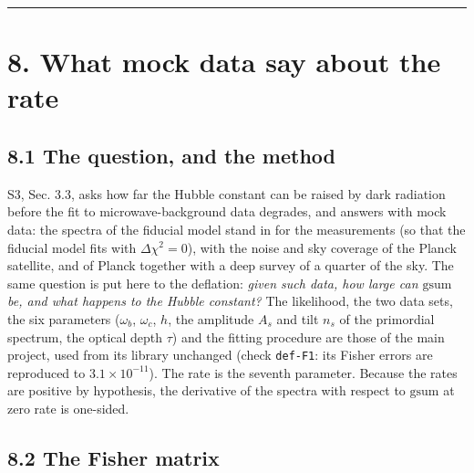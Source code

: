 \documentclass[
  10pt,
]{article}
\begin{document}
\begin{center}\rule{0.5\linewidth}{0.5pt}\end{center}

\hypertarget{what-mock-data-say-about-the-rate}{%
\section{8. What mock data say about the
rate}\label{what-mock-data-say-about-the-rate}}

\hypertarget{the-question-and-the-method}{%
\subsection{8.1 The question, and the
method}\label{the-question-and-the-method}}

S3, Sec. 3.3, asks how far the Hubble constant can be raised by dark
radiation before the fit to microwave-background data degrades, and
answers with mock data: the spectra of the fiducial model stand in for
the measurements (so that the fiducial model fits with
\(\Delta\chi^2=0\)), with the noise and sky coverage of the Planck
satellite, and of Planck together with a deep survey of a quarter of the
sky. The same question is put here to the deflation: \emph{given such
data, how large can \(\mathrm{gsum}\) be, and what happens to the Hubble
constant?} The likelihood, the two data sets, the six parameters
(\(\omega_b\), \(\omega_c\), \(h\), the amplitude \(A_s\) and tilt
\(n_s\) of the primordial spectrum, the optical depth \(\tau\)) and the
fitting procedure are those of the main project, used from its library
unchanged (check \texttt{def-F1}: its Fisher errors are reproduced to
\(3.1\times10^{-11}\)). The rate is the seventh parameter. Because the
rates are positive by hypothesis, the derivative of the spectra with
respect to \(\mathrm{gsum}\) at zero rate is one-sided.

\hypertarget{the-fisher-matrix}{%
\subsection{8.2 The Fisher matrix}\label{the-fisher-matrix}}
\end{document}
